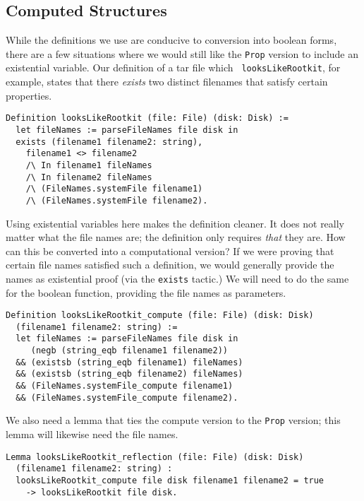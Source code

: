 \documentclass[nocopyrightspace,preprint]{sigplanconf}
\begin{document}
\subsection{Computed Structures}

While the definitions we use are conducive to conversion into boolean forms,
there are a few situations where we would still like the {\tt Prop} version to
include an existential variable. Our definition of a tar file which {\tt
looksLikeRootkit}, for example, states that there {\em exists} two distinct
filenames that satisfy certain properties.

\begin{lstlisting}
Definition looksLikeRootkit (file: File) (disk: Disk) :=
  let fileNames := parseFileNames file disk in
  exists (filename1 filename2: string),
    filename1 <> filename2
    /\ In filename1 fileNames
    /\ In filename2 fileNames
    /\ (FileNames.systemFile filename1)
    /\ (FileNames.systemFile filename2).
\end{lstlisting}

Using existential variables here makes the definition cleaner. It does not
really matter what the file names are; the definition only requires {\em that}
they are. How can this be converted into a computational version? If we were
proving that certain file names satisfied such a definition, we would
generally provide the names as existential proof (via the {\tt exists}
tactic.) We will need to do the same for the boolean function, providing the
file names as parameters.

\begin{lstlisting}
Definition looksLikeRootkit_compute (file: File) (disk: Disk)
  (filename1 filename2: string) :=
  let fileNames := parseFileNames file disk in
     (negb (string_eqb filename1 filename2))
  && (existsb (string_eqb filename1) fileNames)
  && (existsb (string_eqb filename2) fileNames)
  && (FileNames.systemFile_compute filename1)
  && (FileNames.systemFile_compute filename2).
\end{lstlisting}

We also need a lemma that ties the compute version to the {\tt Prop} version;
this lemma will likewise need the file names.

\begin{lstlisting}
Lemma looksLikeRootkit_reflection (file: File) (disk: Disk)
  (filename1 filename2: string) :
  looksLikeRootkit_compute file disk filename1 filename2 = true
    -> looksLikeRootkit file disk.
\end{lstlisting}
\end{document}
